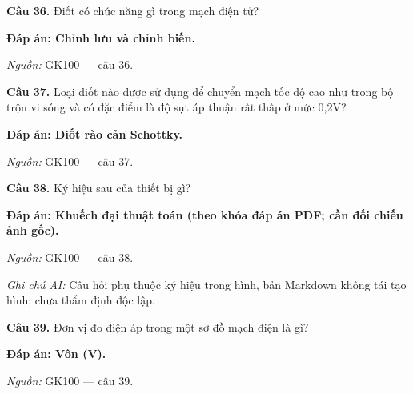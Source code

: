 \documentclass[11pt,a4paper]{article}
\begin{document}
\textbf{Câu 36.} Điốt có chức năng gì trong mạch điện tử?\par
{\color{answer}\textbf{Đáp án: Chỉnh lưu và chỉnh biến.}}\par
{\footnotesize\color{sourcegray}\textit{Nguồn:} GK100 — câu 36.\par}
\vspace{3pt}\par\noindent{\color{black!18}\rule{\linewidth}{0.3pt}}\par\medskip

\textbf{Câu 37.} Loại điốt nào được sử dụng để chuyển mạch tốc độ cao như trong bộ trộn vi sóng và có đặc điểm là độ sụt áp thuận rất thấp ở mức 0,2V?\par
{\color{answer}\textbf{Đáp án: Điốt rào cản Schottky.}}\par
{\footnotesize\color{sourcegray}\textit{Nguồn:} GK100 — câu 37.\par}
\vspace{3pt}\par\noindent{\color{black!18}\rule{\linewidth}{0.3pt}}\par\medskip

\textbf{Câu 38.} Ký hiệu sau của thiết bị gì?\par
{\color{answer}\textbf{Đáp án: Khuếch đại thuật toán (theo khóa đáp án PDF; cần đối chiếu ảnh gốc).}}\par
{\footnotesize\color{sourcegray}\textit{Nguồn:} GK100 — câu 38.\par}
{\footnotesize\color{sourcegray}\textit{Ghi chú AI:} Câu hỏi phụ thuộc ký hiệu trong hình, bản Markdown không tái tạo hình; chưa thẩm định độc lập.\par}
\vspace{3pt}\par\noindent{\color{black!18}\rule{\linewidth}{0.3pt}}\par\medskip

\textbf{Câu 39.} Đơn vị đo điện áp trong một sơ đồ mạch điện là gì?\par
{\color{answer}\textbf{Đáp án: Vôn (V).}}\par
{\footnotesize\color{sourcegray}\textit{Nguồn:} GK100 — câu 39.\par}
\vspace{3pt}\par\noindent{\color{black!18}\rule{\linewidth}{0.3pt}}\par\medskip
\end{document}

